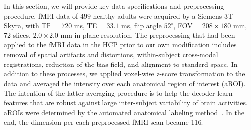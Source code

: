 In this section, we will provide key data specifications and preprocessing procedure.
%
fMRI data of $499$ healthy adults were acquired by a Siemens 3T Skyra, with TR = $720$ ms, TE = $33.1$ ms, flip angle $52^\circ$, FOV = $208 \times 180$ mm, $72$ slices, $2.0 \times 2.0$ mm in plane resolution.
The preprocessing that had been applied to the fMRI data in the HCP prior to our own modification includes removal of spatial artifacts and distortions, within-subject cross-modal registrations, reduction of the bias field, and alignment to standard space.
In addition to these processes, we applied voxel-wise z-score transformation to the data and averaged the intensity over each anatomical region of interest (aROI).
%
The intention of the latter averaging procedure is to help the decoder learn features that are robust against
large inter-subject variability of brain activities.
%
aROIs were determined by the automated anatomical labeling method~\cite{tzourio2002automated}.
%
In the end, the dimension per each preprocessed fMRI scan became 116.

